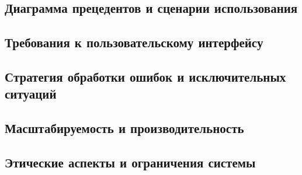 \subsection{Диаграмма прецедентов и сценарии использования}

\subsection{Требования к пользовательскому интерфейсу}

\subsection{Стратегия обработки ошибок и исключительных ситуаций}

\subsection{Масштабируемость и производительность}

\subsection{Этические аспекты и ограничения системы}